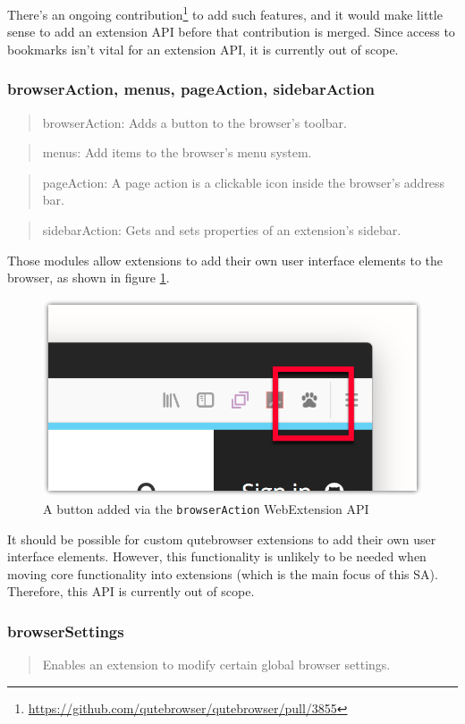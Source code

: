 \documentclass[a4paper,parskip=full,DIV=14,BCOR=15mm]{scrreprt}
\begin{document}
There's an ongoing
contribution\footnote{\url{https://github.com/qutebrowser/qutebrowser/pull/3855}}
to add such features, and it would make little sense to add an extension API before
that contribution is merged. Since access to bookmarks isn't vital for an extension
API, it is currently out of scope.

\subsubsection{browserAction, menus, pageAction, sidebarAction}
\begin{quote}
browserAction: Adds a button to the browser's toolbar.
\end{quote}
\begin{quote}
menus: Add items to the browser's menu system.
\end{quote}
\begin{quote}
pageAction: A page action is a clickable icon inside the browser's address bar.
\end{quote}
\begin{quote}
sidebarAction: Gets and sets properties of an extension's sidebar.
\end{quote}

Those modules allow extensions to add their own user interface elements to the
browser, as shown in figure \ref{img:browser-action}.

\begin{figure}[h]
  \centering
  \includegraphics[width=0.5\linewidth]{img/browser-action.png}
  \caption{A button added via the \texttt{browserAction} WebExtension API}
  \label{img:browser-action}
\end{figure}

It should be possible for custom qutebrowser extensions to add their own user
interface elements. However, this functionality is unlikely to be needed
when moving core functionality into extensions (which is the main focus of this
SA). Therefore, this API is currently out of scope.

\subsubsection{browserSettings}
\begin{quote}
Enables an extension to modify certain global browser settings.
\end{quote}
\end{document}
